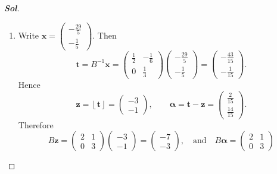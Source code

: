 \begin{enumerate}
\begin{proof}[\normalfont\color{magenta}\bfseries Sol]
\begin{enumerate}
\begin{center}
		\end{center}
		\item 	Write $
		\mathbf x=\begin{pmatrix}{-\frac{29}{5}}\\{-\frac15}\end{pmatrix}$.
		Then
		\[
		\mathbf t
		=
		B^{-1}\mathbf x
		=
		\begin{pmatrix}
			\frac12&-\frac16\\[4pt]
			0&\frac13
		\end{pmatrix}
		\begin{pmatrix}{-\frac{29}{5}}\\ {-\frac15}\end{pmatrix}
		=
		\begin{pmatrix}{-\frac{43}{15}}\\ {-\frac1{15}}\end{pmatrix}.
		\]
		Hence
		\[
		\mathbf z=\left\lfloor \mathbf t\right\rfloor
		=
		\begin{pmatrix}{-3}\\ {-1}\end{pmatrix},
		\qquad
		\boldsymbol\alpha
		=
		\mathbf t-\mathbf z
		=
		\begin{pmatrix}{\frac2{15}}\\ {\frac{14}{15}}\end{pmatrix}.
		\]
		Therefore
		\[
		B\mathbf z
		=
		\begin{pmatrix}
			2&1\\
			0&3
		\end{pmatrix}
		\begin{pmatrix}{-3}\\ {-1}\end{pmatrix}
		=
		\begin{pmatrix}{-7}\\ {-3}\end{pmatrix},\quad\text{and}\quad
		B\boldsymbol\alpha
		=
		\begin{pmatrix}
			2&1\\
			0&3

\end{pmatrix}\]
\end{enumerate}
\end{proof}
\end{enumerate}
